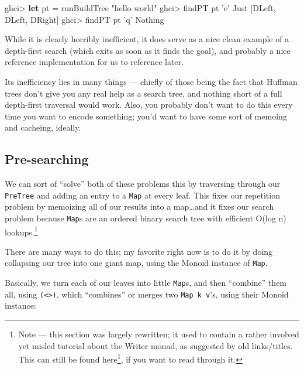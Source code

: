 \documentclass[]{article}
\newenvironment{Shaded}{}{}
\newcommand{\CharTok}[1]{\textcolor[rgb]{0.25,0.44,0.63}{#1}}
\newcommand{\DataTypeTok}[1]{\textcolor[rgb]{0.56,0.13,0.00}{#1}}
\newcommand{\FunctionTok}[1]{\textcolor[rgb]{0.02,0.16,0.49}{#1}}
\newcommand{\KeywordTok}[1]{\textcolor[rgb]{0.00,0.44,0.13}{\textbf{#1}}}
\newcommand{\NormalTok}[1]{#1}
\newcommand{\StringTok}[1]{\textcolor[rgb]{0.25,0.44,0.63}{#1}}
\renewcommand{\href}[2]{#2\footnote{\url{#1}}}
\begin{document}
\begin{Shaded}
\begin{Highlighting}[]
\NormalTok{ghci}\FunctionTok{>} \KeywordTok{let}\NormalTok{ pt }\FunctionTok{=}\NormalTok{ runBuildTree }\StringTok{"hello world"}
\NormalTok{ghci}\FunctionTok{>}\NormalTok{ findPT pt }\CharTok{'e'}
\DataTypeTok{Just}\NormalTok{ [}\DataTypeTok{DLeft}\NormalTok{, }\DataTypeTok{DLeft}\NormalTok{, }\DataTypeTok{DRight}\NormalTok{]}
\NormalTok{ghci}\FunctionTok{>}\NormalTok{ findPT pt }\CharTok{'q'}
\DataTypeTok{Nothing}
\end{Highlighting}
\end{Shaded}

While it is clearly horribly inefficient, it does serve as a nice clean example
of a depth-first search (which exits as soon as it finds the goal), and probably
a nice reference implementation for us to reference later.

Its inefficiency lies in many things --- chiefly of those being the fact that
Huffman trees don't give you any real help as a search tree, and nothing short
of a full depth-first traversal would work. Also, you probably don't want to do
this every time you want to encode something; you'd want to have some sort of
memoing and cacheing, ideally.

\hypertarget{pre-searching}{%
\subsection{Pre-searching}\label{pre-searching}}

We can sort of ``solve'' both of these problems this by traversing through our
\texttt{PreTree} and adding an entry to a \texttt{Map} at every leaf. This fixes
our repetition problem by memoizing all of our results into a map\ldots{}and it
fixes our search problem because \texttt{Map}s are an ordered binary search tree
with efficient O(log n) lookups.\footnote{Note --- this section was largely
  rewritten; it used to contain a rather involved yet misled tutorial about the
  Writer monad, as suggested by old links/titles. This can
  \href{https://github.com/mstksg/inCode/blob/master/copy/entries/.huffman-2-writer.md}{still
  be found here}, if you want to read through it.}

There are many ways to do this; my favorite right now is to do it by doing
collapsing our tree into one giant map, using the Monoid instance of
\texttt{Map}.

Basically, we turn each of our leaves into little \texttt{Map}s, and then
``combine'' them all, using \texttt{(\textless{}\textgreater{})}, which
``combines'' or merges two \texttt{Map\ k\ v}'s, using their Monoid instance:
\end{document}
